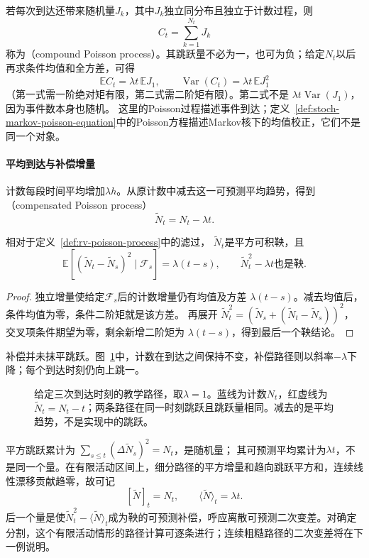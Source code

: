 若每次到达还带来随机量\(J_k\)，其中\(J_k\)独立同分布且独立于计数过程，则
\[
C_t=\sum_{k=1}^{N_t}J_k
\]
称为（compound Poisson process）。其跳跃量不必为一，也可为负；给定\(N_t\)以后再求条件均值和全方差，可得
\[
\mathbb EC_t=\lambda t\,\mathbb EJ_1,\qquad
\operatorname{Var}(C_t)=\lambda t\,\mathbb EJ_1^2
\]
（第一式需一阶绝对矩有限，第二式需二阶矩有限）。第二式不是
\(\lambda t\operatorname{Var}(J_1)\)，因为事件数本身也随机。
这里的Poisson过程描述事件到达；定义~\ref{def:stoch-markov-poisson-equation}中的Poisson方程描述Markov核下的均值校正，它们不是同一个对象。

\paragraph{平均到达与补偿增量}
计数每段时间平均增加\(\lambda h\)。从原计数中减去这一可预测平均趋势，得到（compensated Poisson process）
\[
\widetilde N_t=N_t-\lambda t.
\]
\begin{theorem}[Poisson补偿的鞅性质]
\label{thm:rv-compensated-poisson}
相对于定义~\ref{def:rv-poisson-process}中的滤过，
\(\widetilde N_t\)是平方可积鞅，且
\[
\mathbb E[(\widetilde N_t-\widetilde N_s)^2\mid\mathcal F_s]
=\lambda(t-s),\qquad
\widetilde N_t^2-\lambda t\text{也是鞅}.
\]
\end{theorem}
\begin{proof}
独立增量使给定\(\mathcal F_s\)后的计数增量仍有均值及方差
\(\lambda(t-s)\)。减去均值后，条件均值为零，条件二阶矩就是该方差。
再展开
\(\widetilde N_t^2=(\widetilde N_s+
(\widetilde N_t-\widetilde N_s))^2\)，交叉项条件期望为零，剩余新增二阶矩为
\(\lambda(t-s)\)，得到最后一个鞅结论。
\end{proof}
补偿并未抹平跳跃。图~\ref{fig:rv-poisson-compensation}中，计数在到达之间保持不变，补偿路径则以斜率\(-\lambda\)下降；每个到达时刻仍向上跳一。
\begin{figure}[htbp]
\centering

\caption{给定三次到达时刻的教学路径，取\(\lambda=1\)。蓝线为计数\(N_t\)，红虚线为\(\widetilde N_t=N_t-t\)；两条路径在同一时刻跳跃且跳跃量相同。减去的是平均趋势，不是实现中的跳跃。}
\label{fig:rv-poisson-compensation}
\end{figure}
平方跳跃累计为
\(\sum_{s\leq t}(\Delta\widetilde N_s)^2=N_t\)，是随机量；
其可预测平均累计为\(\lambda t\)，不是同一个量。在有限活动区间上，细分路径的平方增量和趋向跳跃平方和，连续线性漂移贡献趋零，故可记
\[
[\widetilde N]_t=N_t,\qquad
\langle\widetilde N\rangle_t=\lambda t.
\]
后一个量是使\(\widetilde N_t^2-\langle\widetilde N\rangle_t\)成为鞅的可预测补偿，呼应离散可预测二次变差。对确定分割，这个有限活动情形的路径计算可逐条进行；连续粗糙路径的二次变差将在下一例说明。

